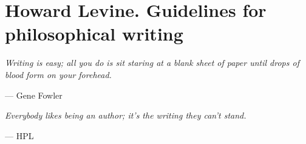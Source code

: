 
\section*{Howard Levine. Guidelines for philosophical writing}

\begin{flushright}
\parbox{7cm}{\sl Writing is easy; all you do is sit staring at a blank sheet of paper until drops of blood form on your forehead.}

--- Gene Fowler

\bigskip

\parbox{7cm}{\sl Everybody likes being an author; it’s the writing they can’t stand.} 

--- HPL
\end{flushright}

